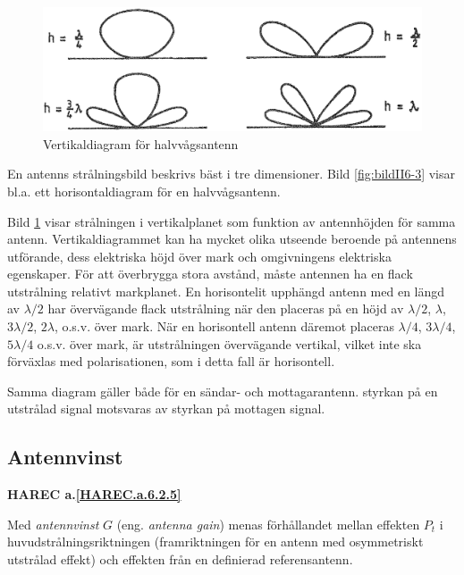 \begin{figure}
  \includegraphics[width=\textwidth]{images/cropped_pdfs/bild_2_6-05.pdf}
  \caption{Vertikaldiagram för halvvågsantenn}
  \label{fig:bildII6-5}
\end{figure}

En antenns strålningsbild beskrivs bäst i tre dimensioner. Bild \ref{fig:bildII6-3}
visar bl.a. ett horisontaldiagram för en halvvågsantenn.

Bild \ref{fig:bildII6-5} visar strålningen i vertikalplanet som funktion av
antennhöjden för samma antenn. Vertikaldiagrammet kan ha mycket olika
utseende beroende på antennens utförande, dess elektriska höjd över
mark och omgivningens elektriska egenskaper. För att överbrygga stora
avstånd, måste antennen ha en flack utstrålning relativt
markplanet. En horisontelit upphängd antenn med en längd av
\(\lambda/2\) har övervägande flack utstrålning när den placeras på en
höjd av \(\lambda/2\), \(\lambda\), \(3\lambda/2\), \(2\lambda\),
o.s.v. över mark. När en horisontell antenn däremot placeras
\(\lambda/4\), \(3\lambda/4\), \(5\lambda/4\) o.s.v. över mark, är
utstrålningen övervägande vertikal, vilket inte ska förväxlas med
polarisationen, som i detta fall är horisontell.

Samma diagram gäller både för en sändar- och mottagarantenn. styrkan
på en utstrålad signal motsvaras av styrkan på mottagen signal.

\subsection{Antennvinst}
\textbf{
  HAREC a.\ref{HAREC.a.6.2.5}\label{myHAREC.a.6.2.5}
}

Med \emph{antennvinst} \(G\) (eng. \emph{antenna gain}) menas förhållandet
mellan effekten \(P_t\) i huvudstrålningsriktningen (framriktningen för en
antenn med osymmetriskt utstrålad effekt) och effekten från en definierad
referensantenn.

